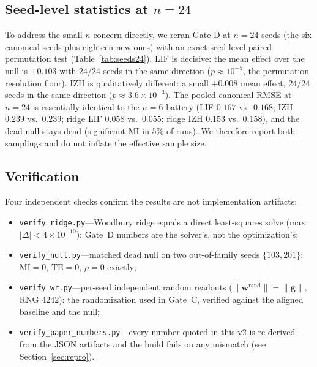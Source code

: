 \documentclass[10pt,a4paper]{article}
\newcommand{\RMSE}{\ensuremath{\mathrm{RMSE}}}
\newcommand{\MI}{\ensuremath{\mathrm{MI}}}
\newcommand{\TE}{\ensuremath{\mathrm{TE}}}
\newcommand{\dfloor}{\ensuremath{\Delta\RMSE_{\mathrm{floor}}}}
\begin{document}
\subsection{Seed-level statistics at $n=24$}\label{sec:seeds24}
\begin{table}[H]
\centering
\caption{Seed-level paired test at $n=24$ seeds. For each seed we pool
the gain-in-$\dfloor$ of the living substrate over the dead null across
the five profiles, then run an exact paired sign-permutation over the
$24$ seeds ($10^5$ permutations).}
\label{tab:seeds24}

\end{table}
To address the small-$n$ concern directly, we reran Gate D at
$n=24$ seeds (the six canonical seeds plus eighteen new ones) with an
exact seed-level paired permutation test (Table~\ref{tab:seeds24}). LIF
is decisive: the mean effect over the null is $+0.103$ with $24/24$
seeds in the same direction ($p\approx10^{-5}$, the permutation
resolution floor). IZH is qualitatively different: a small $+0.008$
mean effect, $24/24$ seeds in the same direction
($p\approx3.6\times10^{-3}$). The pooled canonical RMSE at $n=24$ is
essentially identical to the $n=6$ battery
(LIF $0.167$ vs.\ $0.168$; IZH $0.239$ vs.\ $0.239$; ridge LIF $0.058$
vs.\ $0.055$; ridge IZH $0.153$ vs.\ $0.158$), and the dead null stays
dead (significant $\MI$ in $5\%$ of runs). We therefore report both
samplings and do not inflate the effective sample size.

\subsection{Verification}\label{sec:verify}
Four independent checks confirm the results are not implementation
artifacts:
\begin{itemize}[nosep]
\item \texttt{verify\_ridge.py}---Woodbury ridge equals a direct
least-squares solve (max $|\Delta|<4\times10^{-10}$): Gate~D numbers
are the solver's, not the optimization's;
\item \texttt{verify\_null.py}---matched dead null on two out-of-family
seeds $\{103,201\}$: $\MI=0$, $\TE=0$, $\rho=0$ exactly;
\item \texttt{verify\_wr.py}---per-seed independent random readouts
($\|\mathbf{w}^{\mathrm{rand}}\|=\|\mathbf{g}\|$, RNG $4242$): the
randomization used in Gate~C, verified against the aligned baseline
and the null;
\item \texttt{verify\_paper\_numbers.py}---every number quoted in this
v2 is re-derived from the JSON artifacts and the build fails on any
mismatch (see Section~\ref{sec:repro}).
\end{itemize}
\end{document}
